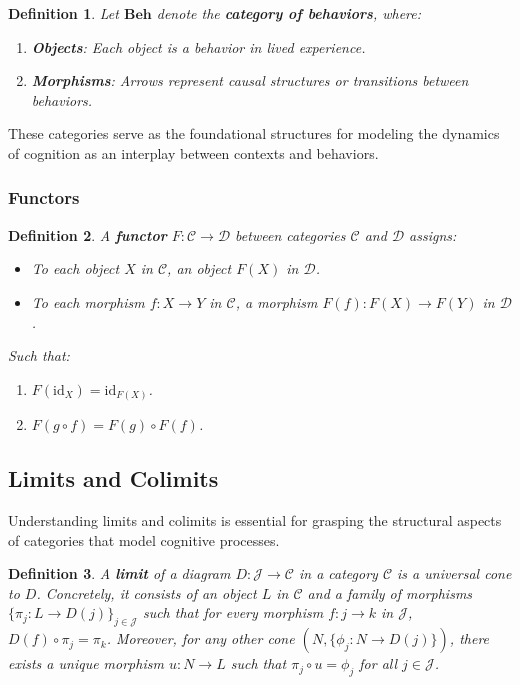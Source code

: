 \documentclass{article}
\newtheorem{definition}{Definition}[section]
\begin{document}
\begin{definition}
Let $\mathbf{Beh}$ denote the \textbf{category of behaviors}, where:
\begin{enumerate}
    \item \textbf{Objects}: Each object is a behavior in lived experience.
    \item \textbf{Morphisms}: Arrows represent causal structures or transitions between behaviors.
\end{enumerate}
\end{definition}

These categories serve as the foundational structures for modeling the dynamics of cognition as an interplay between contexts and behaviors.

\subsubsection{Functors}

\begin{definition} A \textbf{functor} $F \colon \mathcal{C} \to \mathcal{D}$ between categories $\mathcal{C}$ and $\mathcal{D}$ assigns:

\begin{itemize} \item To each object $X$ in $\mathcal{C}$, an object $F(X)$ in $\mathcal{D}$. \item To each morphism $f \colon X \to Y$ in $\mathcal{C}$, a morphism $F(f) \colon F(X) \to F(Y)$ in $\mathcal{D}$. \end{itemize}

Such that:

\begin{enumerate} \item $F(\text{id}_X) = \text{id}_{F(X)}$. \item $F(g \circ f) = F(g) \circ F(f)$. \end{enumerate} \end{definition}

\subsection{Limits and Colimits}

Understanding limits and colimits is essential for grasping the structural aspects of categories that model cognitive processes.

\begin{definition}
A \textbf{limit} of a diagram $D \colon \mathcal{J} \to \mathcal{C}$ in a category $\mathcal{C}$ is a universal cone to $D$. Concretely, it consists of an object $L$ in $\mathcal{C}$ and a family of morphisms $\{\pi_j \colon L \to D(j)\}_{j \in \mathcal{J}}$ such that for every morphism $f \colon j \to k$ in $\mathcal{J}$, $D(f) \circ \pi_j = \pi_k$. Moreover, for any other cone $(N, \{\phi_j \colon N \to D(j)\})$, there exists a unique morphism $u \colon N \to L$ such that $\pi_j \circ u = \phi_j$ for all $j \in \mathcal{J}$.
\end{definition}
\end{document}
